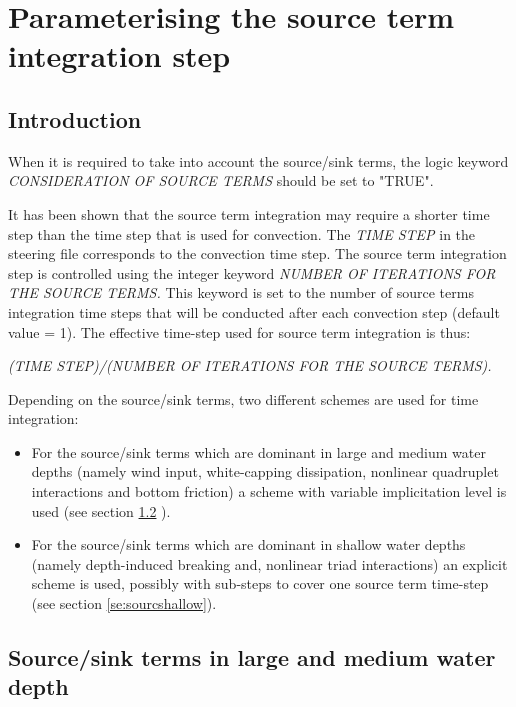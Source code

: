 \section{ Parameterising the source term integration step}


\subsection{ Introduction}

When it is required to take into account the source/sink terms, the logic keyword \textit{CONSIDERATION OF SOURCE TERMS }should be set
to "TRUE".

It has been shown that the source term integration may require a shorter time step than the time step that is used for convection. The
\textit{TIME STEP} in the steering file corresponds to the convection time step. The source term integration step is controlled using
the integer keyword \textit{NUMBER OF ITERATIONS FOR THE SOURCE TERMS.} This keyword is set to the number of source terms integration
time steps that will be conducted after each convection step (default value = 1). The effective time-step used for source term
integration is thus:

 \textit{(TIME STEP)/(NUMBER OF ITERATIONS FOR THE SOURCE TERMS).}

 Depending on the source/sink terms, two different schemes are used for time integration:

\begin{itemize}
\item  For the source/sink terms which are dominant in large and medium water depths (namely wind input, white-capping dissipation,
  nonlinear quadruplet interactions and bottom friction) a scheme with variable implicitation level is used (see section
  \ref{se:sourclarge}
).

\item  For the source/sink terms which are dominant in shallow water depths (namely depth-induced breaking and, nonlinear triad
  interactions) an explicit scheme is used, possibly with sub-steps to cover one source term time-step (see section
  \ref{se:sourcshallow}).
\end{itemize}


\subsection{ Source/sink terms in large and medium water depth}
\label{se:sourclarge}

